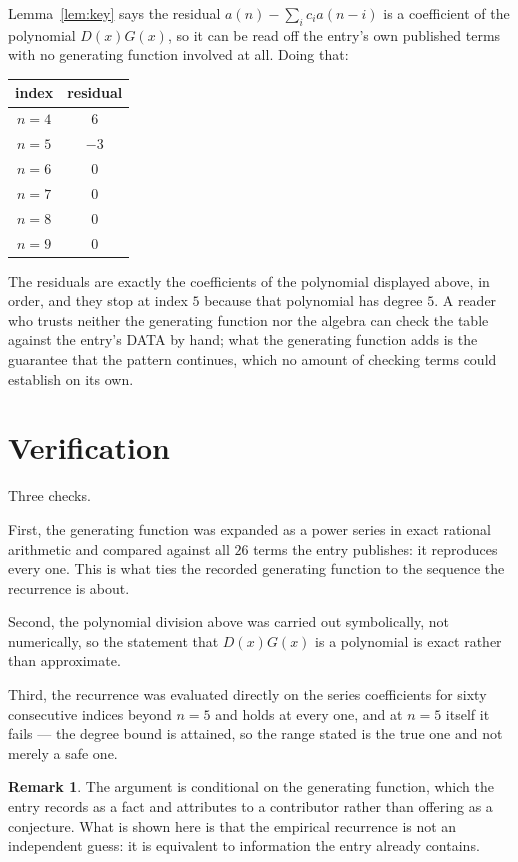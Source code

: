 \documentclass[11pt,a4paper]{article}
\theoremstyle{plain}
\theoremstyle{definition}
\newtheorem{remark}[theorem]{Remark}
\begin{document}
Lemma~\ref{lem:key} says the residual $a(n)-\sum_ic_ia(n-i)$ is a coefficient of the
polynomial $D(x)G(x)$, so it can be read off the entry's own published terms with no
generating function involved at all. Doing that:
\begin{center}
\begin{tabular}{cc}
index & residual \\ \hline
$n=4$ & $6$ \\
$n=5$ & $-3$ \\
$n=6$ & $0$ \\
$n=7$ & $0$ \\
$n=8$ & $0$ \\
$n=9$ & $0$
\end{tabular}
\end{center}
The residuals are exactly the coefficients of the polynomial displayed above, in order, and
they stop at index $5$ because that polynomial has degree $5$. A reader who trusts
neither the generating function nor the algebra can check the table against the entry's DATA
by hand; what the generating function adds is the guarantee that the pattern continues, which
no amount of checking terms could establish on its own.

\section{Verification}

Three checks.

First, the generating function was expanded as a power series in exact rational arithmetic and
compared against all $26$ terms the entry publishes: it reproduces every one. This is
what ties the recorded generating function to the sequence the recurrence is about.

Second, the polynomial division above was carried out symbolically, not numerically, so the
statement that $D(x)G(x)$ is a polynomial is exact rather than approximate.

Third, the recurrence was evaluated directly on the series coefficients for sixty consecutive
indices beyond $n=5$ and holds at every one, and at $n=5$ itself it fails --- the
degree bound is attained, so the range stated is the true one and not merely a safe one.

\begin{remark}
The argument is conditional on the generating function, which the entry records as a fact and
attributes to a contributor rather than offering as a conjecture. What is shown here is that
the empirical recurrence is not an independent guess: it is equivalent to information the
entry already contains.
\end{remark}
\end{document}
